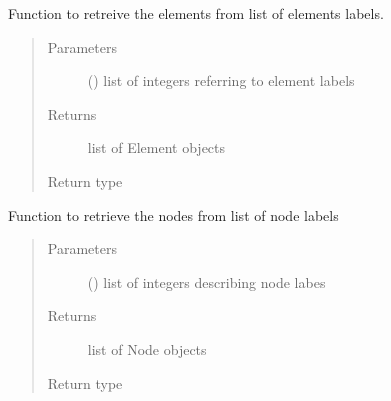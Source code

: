 \documentclass[letterpaper,10pt,english]{sphinxmanual}
\begin{document}
\begin{fulllineitems}
\begin{fulllineitems}
\label{\detokenize{pyCofea/api:cofea.PartMesh.getElementsFromLabelList}}
Function to retreive the elements from list of
elements labels.
\begin{quote}\begin{description}
\item[{Parameters}] \leavevmode
{} () \textendash{} list of integers referring to element labels

\item[{Returns}] \leavevmode
list of Element objects

\item[{Return type}] \leavevmode
{}

\end{description}\end{quote}

\end{fulllineitems}


\begin{fulllineitems}
\label{\detokenize{pyCofea/api:cofea.PartMesh.getNodesFromLabelList}}
Function to retrieve the nodes from list of node labels
\begin{quote}\begin{description}
\item[{Parameters}] \leavevmode
{} () \textendash{} list of integers describing node labes

\item[{Returns}] \leavevmode
list of Node objects

\item[{Return type}] \leavevmode
{}


\end{description}
\end{quote}
\end{fulllineitems}
\end{fulllineitems}
\end{document}
